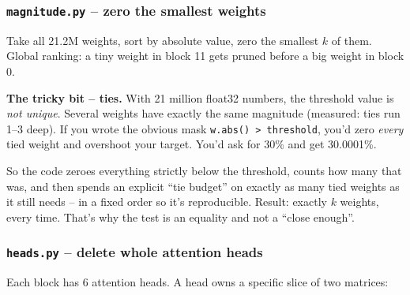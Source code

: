 \documentclass[11pt]{article}
\newcommand{\code}[1]{\texttt{\small #1}}
\begin{document}
\subsubsection*{\texttt{magnitude.py} -- zero the smallest weights}

Take all 21.2M weights, sort by absolute value, zero the smallest $k$ of them.
Global ranking: a tiny weight in block 11 gets pruned before a big weight in
block 0.

\begin{center}
\end{center}

\textbf{The tricky bit -- ties.} With 21 million float32 numbers, the threshold
value is \emph{not unique}. Several weights have exactly the same magnitude
(measured: ties run 1--3 deep). If you wrote the obvious mask
\code{w.abs() > threshold}, you'd zero \emph{every} tied weight and overshoot
your target. You'd ask for 30\% and get 30.0001\%.

So the code zeroes everything strictly below the threshold, counts how many that
was, and then spends an explicit ``tie budget'' on exactly as many tied weights
as it still needs -- in a fixed order so it's reproducible. Result: exactly $k$
weights, every time. That's why the test is an equality and not a
``close enough''.

\subsubsection*{\texttt{heads.py} -- delete whole attention heads}

Each block has 6 attention heads. A head owns a specific slice of two matrices:
\end{document}
